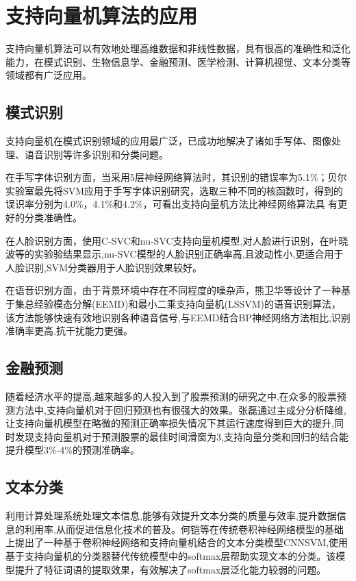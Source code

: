 \chapter{\hei 支持向量机算法的应用}
支持向量机算法可以有效地处理高维数据和非线性数据，具有很高的准确性和泛化能力，在模式识别、生物信息学、金融预测、医学检测、计算机视觉、文本分类等领域都有广泛应用。
\section{\hei 模式识别}
支持向量机在模式识别领域的应用最广泛，已成功地解决了诸如手写体、图像处理、语音识别等许多识别和分类问题。

在手写字体识别方面，当采用5层神经网络算法时，其识别的错误率为5.1\%；贝尔实验室\cite{cortes1995support}最先将SVM应用于手写字体识别研究，选取三种不同的核函数时，得到的误识率分别为4.0\%，4.1\%和4.2\%，可看出支持向量机方法比神经网络算法具 有更好的分类准确性。

在人脸识别方面，使用C-SVC和nu-SVC支持向量机模型,对人脸进行识别，在叶晓波等\cite{叶晓波2019基于支持向量机的人脸识别应用研究}的实验验结果显示,nu-SVC模型的人脸识别正确率高,且波动性小,更适合用于人脸识别,SVM分类器用于人脸识别效果较好。

在语音识别方面，由于背景环境中存在不同程度的噪杂声，熊卫华\cite{熊卫华2018基于最小二乘支持向量机的含噪语音识别算法}等设计了一种基于集总经验模态分解(EEMD)和最小二乘支持向量机(LSSVM)的语音识别算法，该方法能够快速有效地识别各种语音信号,与EEMD结合BP神经网络方法相比,识别准确率更高,抗干扰能力更强。

\section{\hei 金融预测}
随着经济水平的提高,越来越多的人投入到了股票预测的研究之中,在众多的股票预测方法中,支持向量机对于回归预测也有很强大的效果。张磊\cite{张磊2020基于支持向量机的股票市场趋势分析及预测研究}通过主成分分析降维,让支持向量机模型在略微的预测正确率损失情况下其运行速度得到巨大的提升,同时发现支持向量机对于预测股票的最佳时间滑窗为3,支持向量分类和回归的结合能提升模型3\%-4\%的预测准确率。

\section{\hei 文本分类}
利用计算处理系统处理文本信息,能够有效提升文本分类的质量与效率,提升数据信息的利用率,从而促进信息化技术的普及\cite{何焱2019文本分类中支持向量机研究}。何铠等\cite{何铠2022基于深度学习和支持向量机的文本分类模型}在传统卷积神经网络模型的基础上提出了一种基于卷积神经网络和支持向量机结合的文本分类模型CNNSVM,使用基于支持向量机的分类器替代传统模型中的softmax层帮助实现文本的分类。该模型提升了特征词语的提取效果，有效解决了softmax层泛化能力较弱的问题。

